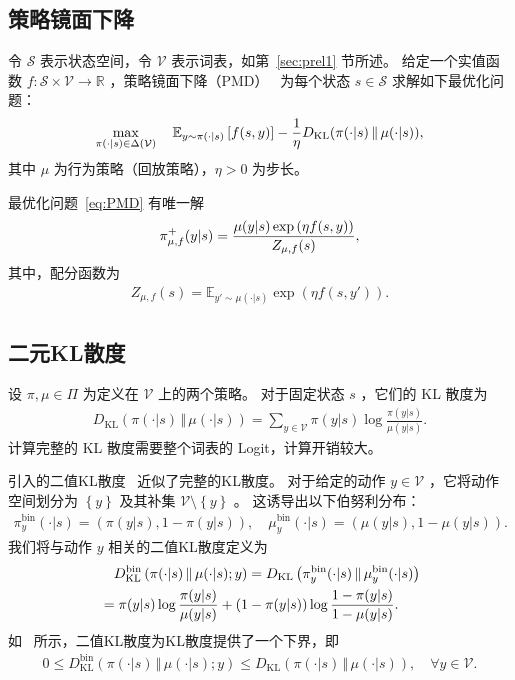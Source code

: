 \documentclass[11pt]{article}
\theoremstyle{definition}
\def\eq#1{\begin{equation*}\begin{split}#1\end{split}\end{equation*}}
\def\eql#1#2{\begin{equation}{#1}\begin{split}#2\end{split}\end{equation}}
\def\pr#1{\left( #1 \right ) }
\def\br#1{\left[ #1 \right ] }
\def\dr#1{\left\{#1\right\}}
\def\calS{\mathcal{S}}
\newcommand \Real{\mathbb{R}}
\newcommand\x{\times}
\def\KL#1#2{D_{\mathrm{KL}}(#1 \,\Vert\, #2)}
\newcommand\Eb{\mathbb{E}}
\begin{document}
\subsection{策略镜面下降}\label{sec:PMD} 
令 $\calS$ 表示状态空间，令 $\mathcal{V}$ 表示词表，如第~\ref{sec:prel1} 节所述。  
给定一个实值函数 $f: \mathcal{S} \x \mathcal{V} \rightarrow \Real$ ，策略镜面下降（PMD）~\cite{geist2019theory,lan2023policy,xiao2022convergence,tomar2020mirror} 为每个状态 $s \in \calS$ 求解如下最优化问题：
\eql{\label{eq:PMD}}{
    \max_{\pi(\cdot | s)\in \Delta(\mathcal{V})} \quad \Eb_{y\sim \pi(\cdot| s)}\br{f(s, y)} - \frac{1}{\eta} {\KL{\pi(\cdot| s)}{\mu(\cdot | s)}},                            
}
其中 $\mu$ 为行为策略（回放策略），$\eta > 0$ 为步长。 

最优化问题~\eqref{eq:PMD} 有唯一解
\eql{\label{eq:piexpw}}{
    \pi^+_{\mu, f}(y|s) = \frac{\mu(y|s)\exp\pr{\eta f(s, y)}}{Z_{\mu, f}(s) },
}
其中，配分函数为
\eq{
    Z_{\mu, f}(s) = \Eb_{y'\sim \mu(\cdot|s)} \exp\pr{\eta f(s, y')}.  
}

\subsection{二元KL散度}\label{sec:binary_kl}
设 $\pi, \mu \in \Pi$ 为定义在 $\mathcal{V}$ 上的两个策略。  
对于固定状态 $s$ ，它们的 KL 散度为  
\eq{
    \KL{\pi(\cdot|s)}{\mu(\cdot|s)}=
    \sum_{y\in\mathcal{V}}
    \pi(y | s)
    \log
    \frac{\pi(y | s)}{\mu(y | s)}.
}  
计算完整的 KL 散度需要整个词表的 Logit，计算开销较大。

引入的二值KL散度~\cite{qi2026rethinking} 近似了完整的KL散度。  
对于给定的动作 $y\in\mathcal{V}$ ，它将动作空间划分为 $\dr{y}$ 及其补集 $\mathcal{V}\setminus\dr{y}$ 。  
这诱导出以下伯努利分布：
\eq{
    \pi^{\mathrm{bin}}_y(\cdot| s)
    = \pr{\pi(y| s), 1 - \pi(y| s)},
    \quad
    \mu^{\mathrm{bin}}_y(\cdot| s)
    = \pr{\mu(y| s), 1 - \mu(y| s)}.
}
我们将与动作 $y$ 相关的二值KL散度定义为
\eql{\label{eq:binary_kl}}{
    &\quad D^{\mathrm{bin}}_{\mathrm{KL}}
    \pr{\pi(\cdot| s)\,\Vert\,\mu(\cdot| s); y}=
    D_{\mathrm{KL}}
    \pr{\pi^{\mathrm{bin}}_y(\cdot| s) \,\Vert\, \mu^{\mathrm{bin}}_y(\cdot| s)}
    \\
    &= \pi(y | s)\log\frac{\pi(y | s)}{\mu(y | s)} + \pr{1-\pi(y | s)}\log\frac{1-\pi(y | s)}{1-\mu(y | s)}.
}
如~\cite{qi2026rethinking} 所示，二值KL散度为KL散度提供了一个下界，即
\eq{
    0 \leq D^{\mathrm{bin}}_{\mathrm{KL}}\pr{\pi(\cdot| s) \,\Vert\, \mu(\cdot| s); y}
    \leq D_{\mathrm{KL}}\pr{\pi(\cdot| s) \,\Vert\, \mu(\cdot| s)}, \quad \forall y \in \mathcal{V}.  
} 
\end{document}
